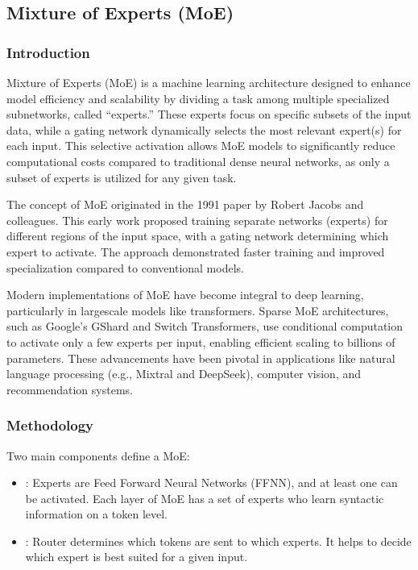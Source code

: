 \documentclass[letterpaper,11pt,english]{sphinxmanual}
\begin{document}
\subsection{Mixture of Experts (MoE)}
\label{\detokenize{pretraining:mixture-of-experts-moe}}

\subsubsection{Introduction}
\label{\detokenize{pretraining:introduction}}
\sphinxAtStartPar
Mixture of Experts (MoE) is a machine learning architecture designed to
enhance model efficiency and scalability by dividing a task among
multiple specialized sub\sphinxhyphen{}networks, called “experts.” These experts focus
on specific subsets of the input data, while a gating network
dynamically selects the most relevant expert(s) for each input. This
selective activation allows MoE models to significantly reduce
computational costs compared to traditional dense neural networks, as
only a subset of experts is utilized for any given task.

\sphinxAtStartPar
The concept of MoE originated in the 1991 paper  by Robert Jacobs and colleagues. This early work proposed
training separate networks (experts) for different regions of the input
space, with a gating network determining which expert to activate. The
approach demonstrated faster training and improved specialization
compared to conventional models.

\sphinxAtStartPar
Modern implementations of MoE have become integral to deep learning,
particularly in large\sphinxhyphen{}scale models like transformers. Sparse MoE
architectures, such as Google’s GShard and Switch Transformers, use
conditional computation to activate only a few experts per input,
enabling efficient scaling to billions of parameters. These advancements
have been pivotal in applications like natural language processing
(e.g., Mixtral and DeepSeek), computer vision, and recommendation
systems.


\subsubsection{Methodology}
\label{\detokenize{pretraining:methodology}}
\sphinxAtStartPar
Two main components define a MoE:
\begin{itemize}
\item {} 
\sphinxAtStartPar
{}: Experts are Feed Forward Neural Networks (FFNN), and at
least one can be activated. Each layer of MoE has a set of experts who
learn syntactic information on a token level.

\item {} 
\sphinxAtStartPar
{}: Router determines which tokens are sent to
which experts. It helps to decide which expert is best suited for a
given input.

\end{itemize}
\end{document}
